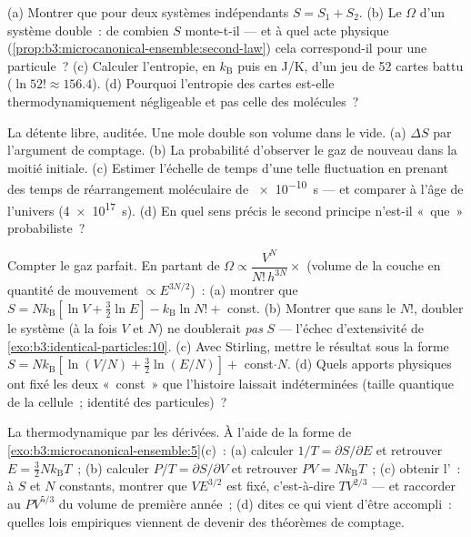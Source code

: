 \begin{exercise}[$\star$]\label{exo:b3:microcanonical-ensemble:3}
(a) Montrer que pour deux systèmes indépendants $S = S_1 + S_2$. (b)
Le $\Omega$ d'un système double~: de combien $S$ monte-t-il --- et à
quel acte physique (\cref{prop:b3:microcanonical-ensemble:second-law})
cela correspond-il pour une particule~? (c) Calculer l'entropie, en
$k_{\text{B}}$ puis en J/K, d'un jeu de 52 cartes battu
($\ln52! \approx 156.4$). (d) Pourquoi l'entropie des cartes est-elle
thermodynamiquement négligeable et pas celle des molécules~?
\end{exercise}

\begin{exercise}[$\star$]\label{exo:b3:microcanonical-ensemble:4}
La détente libre, auditée. Une mole double son volume dans le vide.
(a) $\Delta S$ par l'argument de comptage. (b) La probabilité
d'observer le gaz de nouveau dans la moitié initiale. (c) Estimer
l'échelle de temps d'une telle fluctuation en prenant des temps de
réarrangement moléculaire de \qty{e-10}{s} --- et comparer à l'âge de
l'univers (\qty{4e17}{s}). (d) En quel sens précis le second principe
n'est-il «~que~» probabiliste~?
\end{exercise}

\begin{exercise}[$\star\star$]\label{exo:b3:microcanonical-ensemble:5}
Compter le gaz parfait. En partant de
$\Omega \propto \dfrac{V^N}{N!\,h^{3N}}\times$ (volume de la couche
en quantité de mouvement $\propto E^{3N/2}$)~: (a) montrer que $S = Nk_{\text{B}}[\ln V +
\tfrac32\ln E] - k_{\text{B}}\ln N! + $ const. (b) Montrer que sans le
$N!$, doubler le système (à la fois $V$ et $N$) ne doublerait
\emph{pas} $S$ --- l'échec d'extensivité de
\cref{exo:b3:identical-particles:10}. (c) Avec Stirling, mettre le
résultat sous la forme $S = Nk_{\text{B}}[\ln(V/N) + \tfrac32\ln(E/N)]
+ $ const$\cdot N$. (d) Quels apports physiques ont fixé les deux
«~const~» que l'histoire laissait indéterminées (taille quantique de
la cellule~; identité des particules)~?
\end{exercise}

\begin{exercise}[$\star\star$]\label{exo:b3:microcanonical-ensemble:6}
La thermodynamique par les dérivées. À l'aide de la forme de
\cref{exo:b3:microcanonical-ensemble:5}(c)~: (a) calculer $1/T =
\partial S/\partial E$ et retrouver $E = \tfrac32 Nk_{\text{B}}T$~;
(b) calculer $P/T = \partial S/\partial V$ et retrouver $PV =
Nk_{\text{B}}T$~; (c) obtenir l'~: à $S$ et $N$
constants, montrer que $VE^{3/2}$ est fixé, c'est-à-dire $TV^{2/3}$
--- et raccorder au $PV^{5/3}$ du volume de première année~; (d) dites
ce qui vient d'être accompli~: quelles lois empiriques viennent de
devenir des théorèmes de comptage.
\end{exercise}

